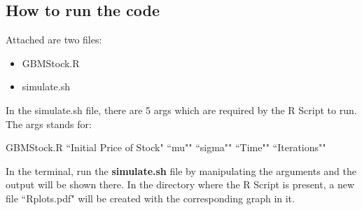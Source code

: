 \documentclass[10pt,a4paper]{article}
\begin{document}
\subsection{How to run the code}
Attached are two files:
\begin{itemize}
\item GBMStock.R
\item simulate.sh
\end{itemize}
In the simulate.sh file, there are 5 args which are required by the R Script to run. The args stands for:\\
\begin{center}
GBMStock.R ``Initial Price of Stock" ``mu"" ``sigma"" ``Time"" ``Iterations""
\end{center}
In the terminal, run the \textbf{simulate.sh} file by manipulating the arguments and the output will be shown there. In the directory where the R Script is present, a new file ``Rplots.pdf" will be created with the corresponding graph in it.
\end{document}
